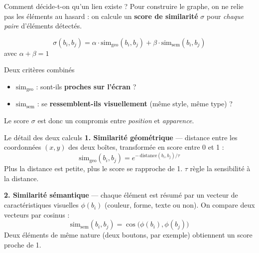 \documentclass[11pt,aspectratio=169]{beamer}
\begin{document}
\begin{frame}{Comment décide-t-on qu'un lien existe ?}
Pour construire le graphe, on ne relie pas les éléments au hasard : on calcule un \textbf{score de similarité} $\sigma$ pour \emph{chaque paire} d'éléments détectés.

\vspace{0.3cm}
\[
\sigma(b_i, b_j) = \alpha \cdot \text{sim}_{\text{geo}}(b_i,b_j) + \beta \cdot \text{sim}_{\text{sem}}(b_i,b_j)
\]
avec $\alpha + \beta = 1$

\vspace{0.3cm}
\begin{block}{Deux critères combinés}
\begin{itemize}
    \item $\text{sim}_{\text{geo}}$ : sont-ils \textbf{proches sur l'écran} ?
    \item $\text{sim}_{\text{sem}}$ : se \textbf{ressemblent-ils visuellement} (même style, même type) ?
\end{itemize}
\end{block}

Le score $\sigma$ est donc un compromis entre \emph{position} et \emph{apparence}.
\end{frame}

\begin{frame}{Le détail des deux calculs}
\textbf{1. Similarité géométrique} --- distance entre les coordonnées $(x,y)$ des deux boîtes, transformée en score entre 0 et 1 :
\[
\text{sim}_{\text{geo}}(b_i,b_j) = e^{-\,\text{distance}(b_i,b_j)/\tau}
\]
Plus la distance est petite, plus le score se rapproche de 1. $\tau$ règle la sensibilité à la distance.

\vspace{0.4cm}
\textbf{2. Similarité sémantique} --- chaque élément est résumé par un vecteur de caractéristiques visuelles $\phi(b_i)$ (couleur, forme, texte ou non). On compare deux vecteurs par cosinus :
\[
\text{sim}_{\text{sem}}(b_i,b_j) = \cos\big(\phi(b_i),\phi(b_j)\big)
\]
Deux éléments de même nature (deux boutons, par exemple) obtiennent un score proche de 1.
\end{frame}
\end{document}
